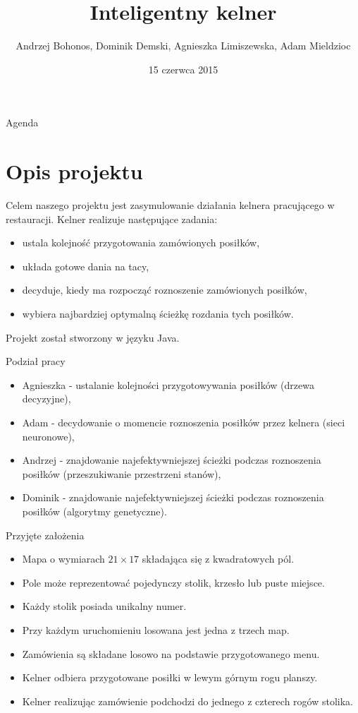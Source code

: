 \documentclass[a4paper,10pt]{beamer}
\date{15 czerwca 2015}
\title{Inteligentny kelner}
\author[A. Bohonos, D. Demski, A. Limiszewska, A. Mieldzioc]{Andrzej Bohonos, Dominik Demski, Agnieszka Limiszewska, Adam Mieldzioc}
\begin{document}
		\begin{frame}
			\titlepage
		\end{frame}
		\begin{frame}{Agenda}
			\tableofcontents
		\end{frame}
		
		\section{Opis projektu}
		\begin{frame}
			Celem naszego projektu jest zasymulowanie działania kelnera pracującego w restauracji. Kelner realizuje następujące zadania:
			\begin{itemize}
				\item ustala kolejność przygotowania zamówionych posiłków,
				\item układa gotowe dania na tacy, 
				\item decyduje, kiedy ma rozpocząć roznoszenie zamówionych posiłków,
				\item wybiera najbardziej optymalną ścieżkę rozdania tych posiłków. 
			\end{itemize}
			Projekt został stworzony w języku Java.
		\end{frame}
		\begin{frame}{Podział pracy}
			\begin{itemize}
				\item Agnieszka - ustalanie kolejności przygotowywania posiłków (drzewa decyzyjne),
				\item Adam - decydowanie o momencie roznoszenia posiłków przez kelnera (sieci neuronowe),
				\item Andrzej - znajdowanie najefektywniejszej ścieżki podczas roznoszenia posiłków (przeszukiwanie przestrzeni stanów),
				\item Dominik - znajdowanie najefektywniejszej ścieżki podczas roznoszenia posiłków (algorytmy genetyczne).
			\end{itemize}
		\end{frame}
		\begin{frame}{Przyjęte założenia}
			\begin{itemize}
				\item Mapa o wymiarach $21\times17$ składająca się z kwadratowych pól. 
				\item Pole może reprezentować pojedynczy stolik, krzesło lub puste miejsce.
				\item Każdy stolik posiada unikalny numer.
				\item Przy każdym uruchomieniu losowana jest jedna z trzech map.
				\item Zamówienia są składane losowo na podstawie przygotowanego menu.
				\item Kelner odbiera przygotowane posiłki w lewym górnym rogu planszy.
				\item Kelner realizując zamówienie podchodzi do jednego z czterech rogów stolika.
				
			\end{itemize}
		\end{frame}
		
\end{document}
